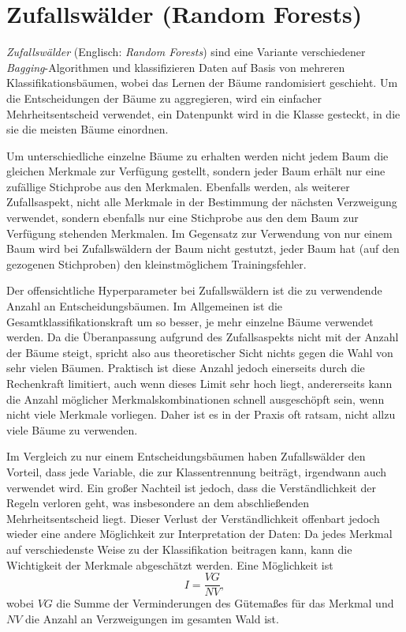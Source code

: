 	\section{Zufallswälder (Random Forests)}
		\emph{Zufallswälder} (Englisch: \emph{Random Forests}) sind eine Variante verschiedener \emph{Bagging}-Algorithmen und klassifizieren Daten auf Basis von mehreren Klassifikationsbäumen, wobei das Lernen der Bäume randomisiert geschieht. Um die Entscheidungen der Bäume zu aggregieren, wird ein einfacher Mehrheitsentscheid verwendet, \dh ein Datenpunkt wird in die Klasse gesteckt, in die sie die meisten Bäume einordnen.

		Um unterschiedliche einzelne Bäume zu erhalten werden nicht jedem Baum die gleichen Merkmale zur Verfügung gestellt, sondern jeder Baum erhält nur eine zufällige Stichprobe aus den Merkmalen. Ebenfalls werden, als weiterer Zufallsaspekt, nicht alle Merkmale in der Bestimmung der nächsten Verzweigung verwendet, sondern ebenfalls nur eine Stichprobe aus den dem Baum zur Verfügung stehenden Merkmalen. Im Gegensatz zur Verwendung von nur einem Baum wird bei Zufallswäldern der Baum nicht gestutzt, \dh jeder Baum hat (auf den gezogenen Stichproben) den kleinstmöglichem Trainingsfehler.

		Der offensichtliche Hyperparameter bei Zufallswäldern ist die zu verwendende Anzahl an Entscheidungsbäumen. Im Allgemeinen ist die Gesamtklassifikationskraft um so besser, je mehr einzelne Bäume verwendet werden. Da die Überanpassung aufgrund des Zufallsaspekts nicht mit der Anzahl der Bäume steigt, spricht also aus theoretischer Sicht nichts gegen die Wahl von sehr vielen Bäumen. Praktisch ist diese Anzahl jedoch einerseits durch die Rechenkraft limitiert, auch wenn dieses Limit sehr hoch liegt, andererseits kann die Anzahl möglicher Merkmalskombinationen schnell ausgeschöpft sein, wenn nicht viele Merkmale vorliegen. Daher ist es in der Praxis oft ratsam, nicht allzu viele Bäume zu verwenden.

		Im Vergleich zu nur einem Entscheidungsbäumen haben Zufallswälder den Vorteil, dass jede Variable, die zur Klassentrennung beiträgt, irgendwann auch verwendet wird. Ein großer Nachteil ist jedoch, dass die Verständlichkeit der Regeln verloren geht, was insbesondere an dem abschließenden Mehrheitsentscheid liegt. Dieser Verlust der Verständlichkeit offenbart jedoch wieder eine andere Möglichkeit zur Interpretation der Daten: Da jedes Merkmal auf verschiedenste Weise zu der Klassifikation beitragen kann, kann die Wichtigkeit der Merkmale abgeschätzt werden. Eine Möglichkeit ist
		\begin{equation}
			I = \frac{\mathit{VG}}{\mathit{NV}},
		\end{equation}
		wobei \(\mathit{VG}\) die Summe der Verminderungen des Gütemaßes für das Merkmal und \(\mathit{NV}\) die Anzahl an Verzweigungen im gesamten Wald ist.

